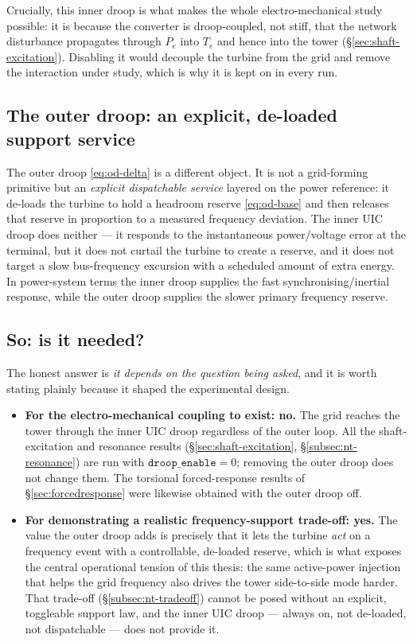 Crucially, this inner droop is what makes the whole electro-mechanical study
possible: it is because the converter is droop-coupled, not stiff, that the
network disturbance propagates through \(P_e\) into \(T_e\) and hence into the
tower (\S\ref{sec:shaft-excitation}). Disabling it would decouple the turbine
from the grid and remove the interaction under study, which is why it is kept on
in every run.

\subsection{The outer droop: an explicit, de-loaded support service}
\label{subsec:odn-outer}

The outer droop \eqref{eq:od-delta} is a different object. It is not a
grid-forming primitive but an \emph{explicit dispatchable service} layered on the
power reference: it de-loads the turbine to hold a headroom reserve
\eqref{eq:od-base} and then releases that reserve in proportion to a measured
frequency deviation. The inner UIC droop does neither --- it responds to the
instantaneous power/voltage error at the terminal, but it does not curtail the
turbine to create a reserve, and it does not target a slow bus-frequency
excursion with a scheduled amount of extra energy. In power-system terms the
inner droop supplies the fast synchronising/inertial response, while the outer
droop supplies the slower primary frequency reserve.

\subsection{So: is it needed?}
\label{subsec:odn-verdict}

The honest answer is \emph{it depends on the question being asked}, and it is
worth stating plainly because it shaped the experimental design.

\begin{itemize}
  \item \textbf{For the electro-mechanical coupling to exist: no.} The grid
        reaches the tower through the inner UIC droop regardless of the outer
        loop. All the shaft-excitation and resonance results
        (\S\ref{sec:shaft-excitation}, \S\ref{subsec:nt-resonance}) are run with
        \(\texttt{droop\_enable}=0\); removing the outer droop does not change
        them. The torsional forced-response results of \S\ref{sec:forcedresponse}
        were likewise obtained with the outer droop off.
  \item \textbf{For demonstrating a realistic frequency-support trade-off: yes.}
        The value the outer droop adds is precisely that it lets the turbine
        \emph{act} on a frequency event with a controllable, de-loaded reserve,
        which is what exposes the central operational tension of this thesis: the
        same active-power injection that helps the grid frequency also drives the
        tower side-to-side mode harder. That trade-off (\S\ref{subsec:nt-tradeoff})
        cannot be posed without an explicit, toggleable support law, and the
        inner UIC droop --- always on, not de-loaded, not dispatchable --- does
        not provide it.
\end{itemize}

